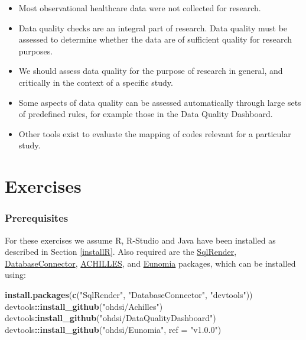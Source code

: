\documentclass[11pt]{book}
\newenvironment{Shaded}{\begin{snugshade}}{\end{snugshade}}
\newcommand{\KeywordTok}[1]{\textcolor[rgb]{0.13,0.29,0.53}{\textbf{#1}}}
\newcommand{\DataTypeTok}[1]{\textcolor[rgb]{0.13,0.29,0.53}{#1}}
\newcommand{\StringTok}[1]{\textcolor[rgb]{0.31,0.60,0.02}{#1}}
\newcommand{\OperatorTok}[1]{\textcolor[rgb]{0.81,0.36,0.00}{\textbf{#1}}}
\newcommand{\NormalTok}[1]{#1}
\theoremstyle{definition}
\theoremstyle{definition}
\theoremstyle{definition}
\theoremstyle{remark}
\let\BeginKnitrBlock\begin \let\EndKnitrBlock\end
\begin{document}
\BeginKnitrBlock{rmdsummary}
\begin{itemize}
\item
  Most observational healthcare data were not collected for research.
\item
  Data quality checks are an integral part of research. Data quality
  must be assessed to determine whether the data are of sufficient
  quality for research purposes.
\item
  We should assess data quality for the purpose of research in general,
  and critically in the context of a specific study.
\item
  Some aspects of data quality can be assessed automatically through
  large sets of predefined rules, for example those in the Data Quality
  Dashboard.
\item
  Other tools exist to evaluate the mapping of codes relevant for a
  particular study.
\end{itemize}
\EndKnitrBlock{rmdsummary}

\section{Exercises}\label{exercises-5}

\subsubsection*{Prerequisites}\label{prerequisites-6}

For these exercises we assume R, R-Studio and Java have been installed
as described in Section \ref{installR}. Also required are the
\href{https://ohdsi.github.io/SqlRender/}{SqlRender},
\href{https://ohdsi.github.io/DatabaseConnector/}{DatabaseConnector},
\href{https://github.com/OHDSI/Achilles}{ACHILLES}, and
\href{https://ohdsi.github.io/Eunomia/}{Eunomia} packages, which can be
installed using:

\begin{Shaded}
\begin{Highlighting}[]
\KeywordTok{install.packages}\NormalTok{(}\KeywordTok{c}\NormalTok{(}\StringTok{"SqlRender"}\NormalTok{, }\StringTok{"DatabaseConnector"}\NormalTok{, }\StringTok{"devtools"}\NormalTok{))}
\NormalTok{devtools}\OperatorTok{::}\KeywordTok{install_github}\NormalTok{(}\StringTok{"ohdsi/Achilles"}\NormalTok{)}
\NormalTok{devtools}\OperatorTok{:}\KeywordTok{install_github}\NormalTok{(}\StringTok{"ohdsi/DataQualityDashboard"}\NormalTok{)}
\NormalTok{devtools}\OperatorTok{::}\KeywordTok{install_github}\NormalTok{(}\StringTok{"ohdsi/Eunomia"}\NormalTok{, }\DataTypeTok{ref =} \StringTok{"v1.0.0"}\NormalTok{)}
\end{Highlighting}
\end{Shaded}
\end{document}
